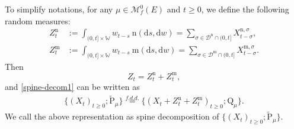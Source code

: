 \documentclass[12pt,a4paper]{amsart}
\numberwithin{equation}{section}
\theoremstyle{plain}
\theoremstyle{definition}
\theoremstyle{remark}
\begin{document}
To simplify notations, for any $\mu \in \mathcal M^0_f(E)$ and	$t\geq 0$,  we define the following random measures:
\begin{align}
	Z^{\mathrm n}_t
	&:= \int_{(0, t]\times \mathbb W} w_{t-s} ~\mathrm n (\mathrm ds, \mathrm dw)
	= \sum_{\sigma \in \mathcal D^\mathrm n \cap (0, t]} X^{\mathrm n,\sigma}_{t-\sigma},
	\\ Z^{\mathrm m}_t
	&:= \int_{(0, t]\times \mathbb W} w_{t-s} ~\mathrm m (\mathrm ds, \mathrm dw)
	= \sum_{\sigma \in \mathcal D^\mathrm m \cap (0, t]} X^{\mathrm m,\sigma}_{t-\sigma}.
\end{align}
Then \begin{equation}\label{def-Zt}
	Z_t= Z^{\mathrm n}_{t} + Z^{\mathrm m}_{t},
\end{equation}
and \eqref{spine-decom1} can be written as
\begin{align}\label{spine-decom2}
	\{(X_t)_{t\geq 0}; \widetilde{\mathrm P}_\mu\}
	\overset{f.d.d.}{=}
	\{(X_t + Z^{\mathrm n}_{t} + Z^{\mathrm m}_{t} )_{t\geq 0}; \mathrm Q_\mu\}.
\end{align}
We call the above representation as spine decomposition of $\{(X_t)_{t\geq 0}; \widetilde{\mathrm P}_\mu\} $.
\end{document}
